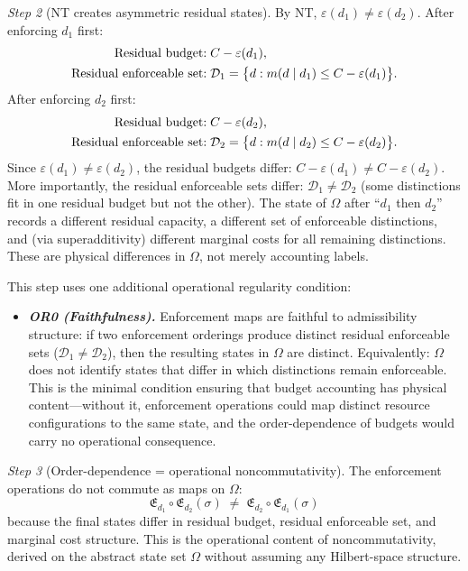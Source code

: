 \documentclass[11pt]{article}
\newenvironment{varlist}{\begin{itemize}[nosep,leftmargin=2em]}{\end{itemize}}
\begin{document}
\begin{tcolorbox}[apfbox, title={Theorem T1 --- The Bridge Theorem (Order-Dependence)}]
\textit{Step 2} (NT creates asymmetric residual states).  By NT, $\varepsilon(d_1) \ne \varepsilon(d_2)$.  After enforcing $d_1$ first:
\begin{align}
\text{Residual budget:}\;& C - \varepsilon(d_1), \notag\\
\text{Residual enforceable set:}\;& \mathcal{D}_1 = \bigl\{d : m(d \mid d_1) \le C - \varepsilon(d_1)\bigr\}.
\end{align}
After enforcing $d_2$ first:
\begin{align}
\text{Residual budget:}\;& C - \varepsilon(d_2), \notag\\
\text{Residual enforceable set:}\;& \mathcal{D}_2 = \bigl\{d : m(d \mid d_2) \le C - \varepsilon(d_2)\bigr\}.
\end{align}
Since $\varepsilon(d_1) \ne \varepsilon(d_2)$, the residual budgets differ: $C - \varepsilon(d_1) \ne C - \varepsilon(d_2)$.  More importantly, the residual enforceable sets differ: $\mathcal{D}_1 \ne \mathcal{D}_2$ (some distinctions fit in one residual budget but not the other).  The state of $\Omega$ after ``$d_1$ then $d_2$'' records a different residual capacity, a different set of enforceable distinctions, and (via superadditivity) different marginal costs for all remaining distinctions.  These are physical differences in $\Omega$, not merely accounting labels.

This step uses one additional operational regularity condition:
\begin{varlist}
\item \textbf{\textit{OR0 (Faithfulness).}}  Enforcement maps are faithful to admissibility structure: if two enforcement orderings produce distinct residual enforceable sets ($\mathcal{D}_1 \ne \mathcal{D}_2$), then the resulting states in $\Omega$ are distinct.  Equivalently: $\Omega$ does not identify states that differ in which distinctions remain enforceable.  This is the minimal condition ensuring that budget accounting has physical content---without it, enforcement operations could map distinct resource configurations to the same state, and the order-dependence of budgets would carry no operational consequence.
\end{varlist}

\textit{Step 3} (Order-dependence = operational noncommutativity).  The enforcement operations do not commute as maps on $\Omega$:
\begin{equation}
\mathfrak{E}_{d_1} \circ \mathfrak{E}_{d_2}(\sigma) \;\ne\; \mathfrak{E}_{d_2} \circ \mathfrak{E}_{d_1}(\sigma)
\end{equation}
because the final states differ in residual budget, residual enforceable set, and marginal cost structure.  This is the operational content of noncommutativity, derived on the abstract state set $\Omega$ without assuming any Hilbert-space structure.


\end{tcolorbox}
\end{document}
